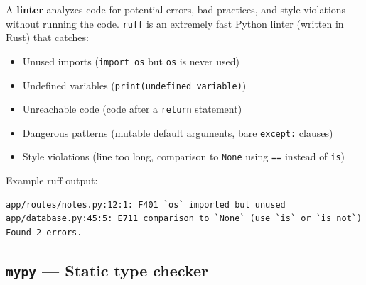 A \textbf{linter} analyzes code for potential errors, bad practices, and style violations without running the code. \texttt{ruff} is an extremely fast Python linter (written in Rust) that catches:

\begin{itemize}
\tightlist
\item
  Unused imports (\texttt{import\ os} but \texttt{os} is never used)
\item
  Undefined variables (\texttt{print(undefined\_}\allowbreak{}\texttt{variable)})
\item
  Unreachable code (code after a \texttt{return} statement)
\item
  Dangerous patterns (mutable default arguments, bare \texttt{except:} clauses)
\item
  Style violations (line too long, comparison to \texttt{None} using \texttt{==} instead of \texttt{is})
\end{itemize}

\begin{codebox}[short]

\begin{Shaded}
\begin{Highlighting}[]

\end{Highlighting}
\end{Shaded}

\end{codebox}

\noindent{}Example ruff output:

\begin{outputbox}[short]
\begin{Verbatim}[fontsize=\codesize, breaklines, breakanywhere, breaksymbolleft={\tiny\textcolor{muted}{$\hookrightarrow$}}]
app/routes/notes.py:12:1: F401 `os` imported but unused
app/database.py:45:5: E711 comparison to `None` (use `is` or `is not`)
Found 2 errors.
\end{Verbatim}
\end{outputbox}

\subsection*{\texorpdfstring{\texttt{mypy} --- Static type checker}{mypy --- Static type checker}}\label{17-build-process:mypy--static-type-checker}

